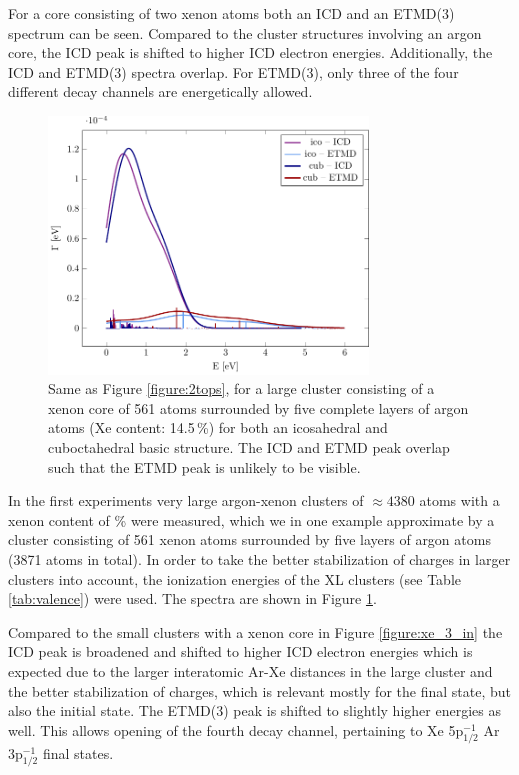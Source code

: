\documentclass[journal=jpccck,manuscript=article]{achemso}
\begin{document}
For a core consisting of two xenon atoms both an ICD and an ETMD(3) spectrum
can be seen. Compared to the cluster structures involving an argon core, the ICD peak is
shifted to higher ICD electron energies. 
Additionally, the ICD and ETMD(3) spectra overlap.
For ETMD(3), only three of the four different decay channels are
energetically allowed.

\begin{figure}[ht]
 \centering
 \includegraphics[width=8.5cm]{c6l5.pdf}
 \caption{Same as Figure \protect\ref{figure:2tops},
          for a large cluster consisting
          of a xenon core of 561 atoms surrounded by five complete layers of
          argon atoms (Xe content: 14.5\,\%) for both an icosahedral and
          cuboctahedral basic structure.
          The ICD and ETMD peak overlap such that the ETMD peak
          is unlikely to be visible.}
 \label{figure:xe_6_lay5}
\end{figure}
%
In the first experiments very large argon-xenon clusters of 
$\approx 4380$ atoms with a xenon content of \unit[19]{\%}
were measured,\cite{Mucke_phd}
which we in one example approximate by a cluster consisting of 561 xenon
atoms surrounded
by five layers of argon atoms (3871 atoms in total). In order to take the
better stabilization of charges in larger clusters into account, the
ionization energies of the XL clusters (see Table \ref{tab:valence})
were used.
The spectra are shown in 
Figure \ref{figure:xe_6_lay5}.

Compared to the small clusters with a xenon core in Figure \ref{figure:xe_3_in}
the ICD peak is broadened and shifted to higher ICD electron energies which is
expected due to the larger interatomic Ar-Xe distances in the large cluster and
the better stabilization of charges, which is relevant mostly for the final state, but also the initial state.
The ETMD(3) peak is shifted to slightly higher energies as well. This allows opening of the
fourth decay channel, pertaining to Xe 5p$_{1/2}^{-1}$ Ar 3p$_{1/2}^{-1}$ final states.
\end{document}
